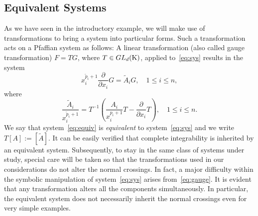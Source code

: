 \documentclass[final,1p,times,number,amsthm]{elsart}
\newcommand{\pder}[2]{\frac{\partial}{\partial #2}#1}
\begin{document}
\subsection{Equivalent Systems}
As we have seen in the introductory example, we will make use of transformations
to bring a system into particular forms. Such a transformation acts on a
Pfaffian system as follows: A linear transformation (also called gauge
transformation) $F=T G$, where
$T \in GL_d({\rm K})$, applied to~\eqref{eq:sys} results in the system 
\begin{equation}
  \label{eq:equiv}
x_i^{\tilde{p}_i+1} \pder{G}{x_i} = \tilde{A}_i G, \quad 1 \leq i \leq n,
\end{equation}
where
\begin{equation}
  \label{eq:gauge}
  \frac{\tilde{A}_i }{x^{\tilde{p}_i +1}_i} = T^{-1}  ( \frac{A_i}{
    x^{p_i+1}_i} T - \pder{T}{x_i}), \quad 1 \leq i \leq n.
\end{equation}
We say that system~\eqref{eq:equiv} is \textit{equivalent} to
system~\eqref{eq:sys} and we write $T[A]:=[\tilde{A}]$. It can be easily
verified that complete integrability is inherited by an equivalent
system. Subsequently, to stay in the same class of systems under study, special
care will be taken so that the transformations used in our considerations do not
alter the normal crossings. In fact, a major difficulty within the symbolic
manipulation of system~\eqref{eq:sys} arises from~\eqref{eq:gauge}. It is
evident that any transformation alters all the components simultaneously. In
particular, the equivalent system does not necessarily inherit the normal
crossings even for very simple examples.
\end{document}
